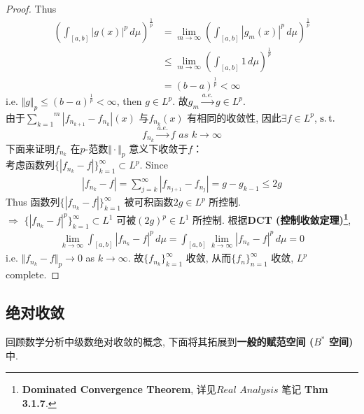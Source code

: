 \begin{thm}
\begin{proof}
			Thus
			\begin{align}
				\left( \int_{[a , b]} \left| g(x) \right|^p \, d\mu \right)^{\tfrac{1}{p}} 
				&= \lim_{m \to \infty} \left( \int_{[a , b]} \left| g_{m}(x) \right|^p \, d\mu \right)^{\tfrac{1}{p}} \\
				&\leq \lim_{m \to \infty} \left( \int_{[a , b]} 1 \, d\mu \right)^{\tfrac{1}{p}} \\
				&= (b - a)^{\tfrac{1}{p}} < \infty
			\end{align}
			i.e. $\Vert g \Vert_{p} \leq (b - a)^{\tfrac{1}{p}} < \infty$, then $g \in L^p$. 故$g_m \overset{a.e.}{\to} g \in L^p$. \\
			由于$\overset{m}{\underset{k = 1}{\sum}} \left| f_{n_{k + 1}} - f_{n_k} \right|(x)$ 与$f_{n_k}(x)$ 有相同的收敛性, 因此$\exists f \in L^p$, $\operatorname{s.t.}$
			\[ f_{n_k} \overset{a.e.}{\to} f \,\, as \,\, k \to \infty \]
			下面来证明$f_{n_k}$ 在$p$-范数$\Vert \cdot \Vert_p$ 意义下收敛于$f$：\\
			考虑函数列$\{ \left| f_{n_k} - f \right| \}_{k = 1}^{\infty} \subset L^p$. Since
			\begin{align}
				\left| f_{n_k} - f \right| 
				= \sum_{j = k}^{\infty} \left| f_{n_{j + 1}} - f_{n_j} \right| 
				= g - g_{k - 1} \leq 2g
			\end{align}
			Thus 函数列$\{ \left| f_{n_k} - f \right| \}_{k = 1}^{\infty}$ 被可积函数$2g \in L^p$ 所控制. \\
			$\Rightarrow \,\, \{ \left| f_{n_k} - f \right|^p \}_{k = 1}^{\infty} \subset L^1$ 可被$(2g)^p \in L^1$ 所控制. 根据\textbf{DCT (控制收敛定理)\footnote{\textbf{Dominated Convergence Theorem}, 详见$Real \,\, Analysis$ 笔记 \textbf{Thm 3.1.7}.}}, 
			\begin{align}
				\lim_{k \to \infty} \int_{[a , b]} \left| f_{n_k} - f \right|^p \, d\mu 
				= \int_{[a , b]} \lim_{k \to \infty} \left| f_{n_k} - f \right|^p \, d\mu = 0
			\end{align}
			i.e. $\Vert f_{n_k} - f \Vert_{p} \to 0$ as $k \to \infty$. 故$\{ f_{n_k} \}_{k = 1}^{\infty}$ 收敛, 从而$\{ f_n \}_{n = 1}^{\infty}$ 收敛, $L^p$ complete.
		\end{proof}
	\end{thm}

\newpage

\subsection{绝对收敛}
	回顾数学分析中级数绝对收敛的概念, 下面将其拓展到\textbf{一般的赋范空间 ($B^*$ 空间)}中. 
	
